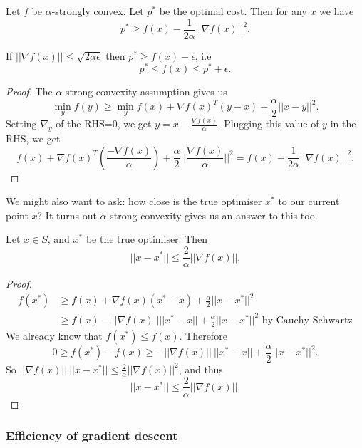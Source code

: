 \documentclass[a4paper]{scrartcl}
\begin{document}
\begin{proposition}
	Let $f$ be $\alpha$-strongly convex. Let $p^*$ be the optimal cost. Then for any $x$ we have \[p^* \geq f(x)-\frac{1}{2\alpha}||\nabla f(x)||^2.\]
\end{proposition}
\begin{remark}
	If $||\nabla f (x)||\leq \sqrt{2\alpha \epsilon}$ then $p^* \geq f(x)-\epsilon$, i.e 
	\[p^* \leq f (x) \leq p^*+ \epsilon.\]
	
\end{remark}
\begin{proof}
	 The $\alpha$-strong convexity assumption gives us 
	 \[\min_y f(y)\geq \min_y f (x)+ \nabla f (x)^T (y-x)+\frac{\alpha}{2}||x-y||^2.\]
	 Setting $\nabla_y$ of the RHS=0, we get $y=x-\frac{\nabla f (x)}{\alpha}.$\newline 
	 Plugging this value of $y$ in the RHS, we get 
	 \[f(x)+\nabla f(x)^T (\frac{-\nabla f (x)}{\alpha})+\frac{\alpha}{2}||\frac{\nabla f(x)}{\alpha}||^2=f (x)- \frac{1}{2\alpha}||\nabla f (x)||^2.\]
	 
\end{proof}

We might also want to ask: how close is the true optimiser $x^*$ to our current point $x$? It turns out $\alpha$-strong convexity gives us an answer to this too.

\begin{proposition}
	Let $x \in S$, and $x^*$ be the true optimiser. Then
	\[||x-x^*||\leq \frac{2}{\alpha}||\nabla f (x)||.\]
	
\end{proposition}
\begin{proof}
	 \begin{equation*}
		  \begin{split}
			  f(x^*)&\geq f(x)+\nabla f(x)(x^*-x)+ \frac{\alpha}{2}||x-x^*||^2\\
			  &\geq f(x)-||\nabla f(x)||||x^*-x||+\frac{\alpha}{2}||x-x^*||^2 \text{ by Cauchy-Schwartz} 
		  \end{split}
	 \end{equation*}
	We already know that $f (x^*)\leq f (x)$. Therefore 
	\[0 \geq f (x^*)-f (x)\geq -||\nabla f (x)|| \ ||x^*-x||+ \frac{\alpha}{2}||x-x^*||^2.\]
	So $||\nabla f (x)||\ ||x-x^*||\leq \frac{2}{\alpha}||\nabla f (x)||^2$, and thus 
	\[||x-x^*||\leq \frac{2}{\alpha}||\nabla f (x)||.\]
	
\end{proof}
\subsubsection{Efficiency of gradient descent}
\end{document}
